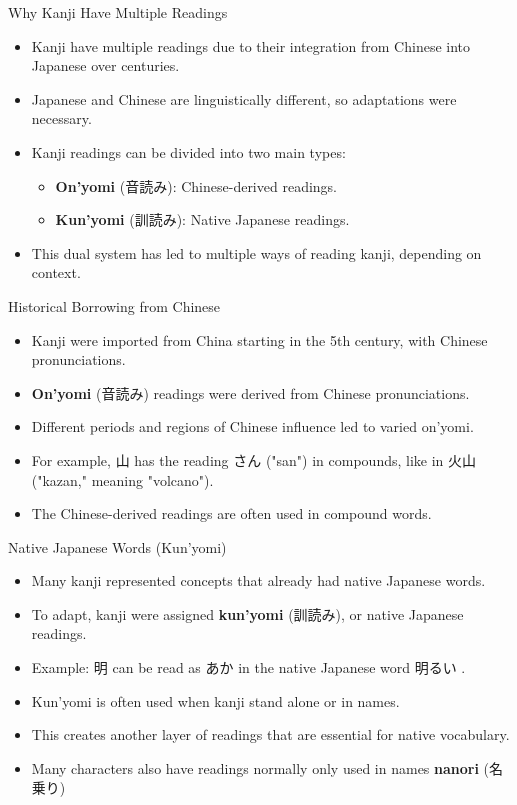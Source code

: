\documentclass[xetex]{beamer}
\newcommand{\jpn}{\mtciteform}
\begin{document}
\begin{frame}{Why Kanji Have Multiple Readings}
\begin{itemize}
    \item Kanji have multiple readings due to their integration from Chinese into Japanese over centuries.
    \item Japanese and Chinese are linguistically different, so adaptations were necessary.
    \item Kanji readings can be divided into two main types:
    \begin{itemize}
        \item \textbf{On’yomi} (\textjapanese{音読み}): Chinese-derived readings.
        \item \textbf{Kun’yomi} (\textjapanese{訓読み}): Native Japanese readings.
    \end{itemize}
    \item This dual system has led to multiple ways of reading kanji, depending on context.
\end{itemize}
\end{frame}

\begin{frame}{Historical Borrowing from Chinese}
\begin{itemize}
    \item Kanji were imported from China starting in the 5th century, with Chinese pronunciations.
    \item \textbf{On’yomi} (\textjapanese{音読み}) readings were derived from Chinese pronunciations.
    \item Different periods and regions of Chinese influence led to varied on’yomi.
    \item For example, \textjapanese{山} has the reading \textjapanese{さん} ("san") in compounds, like in \textjapanese{火山} ("kazan," meaning "volcano").
    \item The Chinese-derived readings are often used in compound words.
\end{itemize}
\end{frame}

\begin{frame}{Native Japanese Words (Kun’yomi)}
\begin{itemize}
    \item Many kanji represented concepts that already had native Japanese words.
    \item To adapt, kanji were assigned \textbf{kun’yomi} (\textjapanese{訓読み}), or native Japanese readings.
    \item Example: \textjapanese{明} can be read as \textjapanese{あか} in  the native Japanese word  明るい \jpn[bright]{akarui}.
    \item Kun’yomi is often used when kanji stand alone or in names.
    \item This creates another layer of readings that are essential for native vocabulary.
    \item Many characters also have readings normally only used in names \textbf{nanori} (\textjapanese{名乗り})
\end{itemize}
\end{frame}
\end{document}

